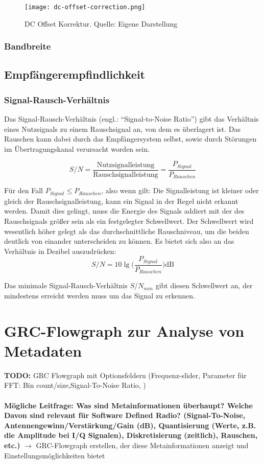 \begin{figure}[ht]
	\centering
	\texttt{[image: dc-offset-correction.png]}
	\caption[DC Offset Korrektur]{DC Offset Korrektur. Quelle: Eigene Darstellung} 
	\label{dc-offset-correction}
\end{figure}


\subsubsection{Bandbreite}



\subsection{Empfängerempfindlichkeit}
\subsubsection{Signal-Rausch-Verhältnis}
Das Signal-Rausch-Verhältnis (engl.: \enquote{Signal-to-Noise Ratio}) gibt das Verhältnis eines Nutzsignals 
zu einem Rauschsignal an, von dem es überlagert ist. Das Rauschen kann dabei durch das Empfängersystem selbst, 
sowie durch Störungen im Übertragungskanal verursacht worden sein. %

\[ S/N = \frac{\text{Nutzsignalleistung}}{\text{Rauschsignalleistung}} = \frac{P_{Signal}}{P_{Rauschen}} \]


Für den Fall \(P_{Signal} \leq P_{Rauschen}\), also wenn gilt: 
Die Signalleistung ist kleiner oder gleich der Rauschsignalleistung, kann ein Signal in der Regel nicht erkannt werden.
Damit dies gelingt, muss die Energie des Signals addiert mit der des Rauschsignals größer sein als ein festgelegter Schwellwert.
Der Schwellwert wird wesentlich höher gelegt als das durchschnittliche Rauschniveau, um die beiden deutlich von einander unterscheiden zu können.
Es bietet sich also an das Verhältnis in Dezibel auszudrücken:
\[ S/N = 10 \lg \Big( \frac{P_{Signal}}{P_{Rauschen}} \Big) \text{dB}\] 



Das minimale Signal-Rausch-Verhältnis \(S/N_{min}\) gibt diesen Schwellwert an, der mindestens erreicht werden muss um das Signal zu erkennen. 



\newpage
\section{GRC-Flowgraph zur Analyse von Metadaten}
\textbf{TODO: } GRC Flowgraph mit Optionsfeldern (Frequenz-slider, Parameter für FFT: Bin count/size,Signal-To-Noise Ratio, )\\
\\
\textbf{Mögliche Leitfrage: Was sind Metainformationen überhaupt? Welche Davon sind relevant für Software Defined Radio? (Signal-To-Noise, Antennengewinn/Verstärkung/Gain (dB), Quantisierung (Werte, z.B. die Amplitude bei I/Q Signalen), Diskretisierung (zeitlich), Rauschen, etc.)} $\rightarrow$ GRC-Flowgraph erstellen, der diese Metainformationen anzeigt und Einstellungsmöglichkeiten bietet

